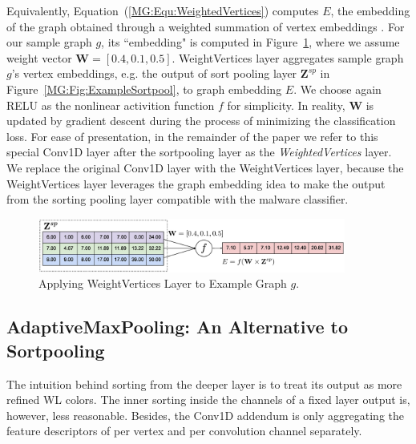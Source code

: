 Equivalently, Equation~(\ref{MG:Equ:WeightedVertices}) computes $E$, the embedding of the graph obtained through a weighted summation of vertex embeddings \cite{GraphEmbedding}.
For our sample graph $g$, its ``embedding" is computed in Figure~\ref{MG:Fig:ExampleWeightedVertice}, where we assume weight vector $\mathbf{W}=[0.4, 0.1, 0.5]$.
WeightVertices layer aggregates sample graph $g$'s vertex embeddings,
e.g. the output of sort pooling layer $\mathbf{Z}^{sp}$ in Figure~\ref{MG:Fig:ExampleSortpool}, to graph embedding $E$.
We choose again RELU as the nonlinear activition function $f$ for simplicity.
In reality, $\mathbf{W}$ is updated by gradient descent during the process of minimizing the classification loss.
For ease of presentation, in the remainder of the paper we refer to this special Conv1D layer after the sortpooling layer as the \textit{WeightedVertices} layer.
We replace the original Conv1D layer with the WeightVertices layer, because the WeightVertices layer leverages the graph embedding idea to make the output from the sorting pooling layer compatible with the malware classifier.

\begin{figure}[htbp]
\centerline{\includegraphics[width=0.90\textwidth]{Magic/figures/ExampleWeightedVertice.eps}}
\caption{Applying WeightVertices Layer to Example Graph $g$.}
\label{MG:Fig:ExampleWeightedVertice}
\end{figure}

\subsection{AdaptiveMaxPooling: An Alternative to Sortpooling}
The intuition behind sorting from the deeper layer is to treat its output as more refined WL colors\cite{WlAlgorithm, WlGraphKernel}.
The inner sorting inside the channels of a fixed layer output is, however, less reasonable.
Besides, the Conv1D addendum is only aggregating the feature descriptors of per vertex and per convolution channel separately.

